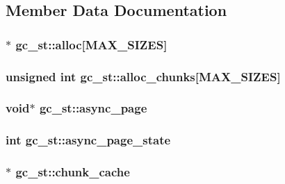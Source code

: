 \subsection{Member Data Documentation}
\hypertarget{structgc__st_ad2473d591b0ffda8ce54ca445f6f6662}{
\subsubsection[{alloc}]{$\ast$ gc\-\_\-st\-::alloc\mbox{[}{\bf M\-A\-X\-\_\-\-S\-I\-Z\-E\-S}\mbox{]}}}\label{structgc__st_ad2473d591b0ffda8ce54ca445f6f6662}
\hypertarget{structgc__st_a1adda3a9c4a27de6dbc5245c62d083d1}{
\subsubsection[{alloc\-\_\-chunks}]{\setlength{\rightskip}{0pt plus 5cm}unsigned int gc\-\_\-st\-::alloc\-\_\-chunks\mbox{[}{\bf M\-A\-X\-\_\-\-S\-I\-Z\-E\-S}\mbox{]}}}\label{structgc__st_a1adda3a9c4a27de6dbc5245c62d083d1}
\hypertarget{structgc__st_af00135e23e51902c07df6f359491bc80}{
\subsubsection[{async\-\_\-page}]{\setlength{\rightskip}{0pt plus 5cm}void$\ast$ gc\-\_\-st\-::async\-\_\-page}}\label{structgc__st_af00135e23e51902c07df6f359491bc80}
\hypertarget{structgc__st_a916bd3e0e79b8461de68a4ca9084af0e}{
\subsubsection[{async\-\_\-page\-\_\-state}]{\setlength{\rightskip}{0pt plus 5cm}int gc\-\_\-st\-::async\-\_\-page\-\_\-state}}\label{structgc__st_a916bd3e0e79b8461de68a4ca9084af0e}
\hypertarget{structgc__st_a047ca4f5451bbc921224a07a9521a780}{
\subsubsection[{chunk\-\_\-cache}]{$\ast$ gc\-\_\-st\-::chunk\-\_\-cache}}\label{structgc__st_a047ca4f5451bbc921224a07a9521a780}
